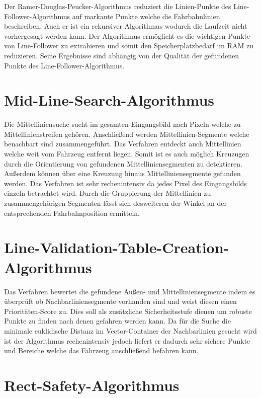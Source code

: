 Der Ramer-Douglas-Peucker-Algorithmus reduziert die Linien-Punkte des Line-Follower-Algorithmus auf markante Punkte welche die Fahrbahnlinien beschreiben. Auch er ist ein rekursiver Algorithmus wodurch die Laufzeit nicht vorhergesagt werden kann. Der Algorithmus erm\"oglicht es die wichtigen Punkte von Line-Follower zu extrahieren und somit den Speicherplatzbedarf im RAM zu reduzieren. Seine Ergebnisse sind abh\"angig von der Qualit\"at der gefundenen Punkte des Line-Follower-Algorithmus. 

\section{Mid-Line-Search-Algorithmus}
\label{section:Mid-Line-Search-Algorithmus}
Die Mittelliniensuche sucht im gesamten Eingangsbild nach Pixeln welche zu Mittellinienstreifen geh\"oren. Anschlie{\ss}end werden Mittellinien-Segmente welche benachbart sind zusammengef\"uhrt. Das Verfahren entdeckt auch Mittellinien welche weit vom Fahrzeug entfernt liegen. Somit ist es auch m\"oglich Kreuzugen durch die Orientierung von gefundenen Mittelliniensegmenten zu detektieren. Au{\ss}erdem k\"onnen \"uber eine Kreuzung hinaus Mittelliniensegmente gefunden werden. Das Verfahren ist sehr rechenintensiv da jedes Pixel des Eingangsbilds einzeln betrachtet wird. Durch die Gruppierung der Mittellinien zu zusammengeh\"origen Segmenten l\"asst sich desweiteren der Winkel an der entsprechenden Fahrbahnposition ermitteln.

\section{Line-Validation-Table-Creation-Algorithmus}
\label{section:Line-Validation-Table-Creation-Algorithmus}

Das Verfahren bewertet die gefundene Au{\ss}en- und Mittelliniensegmente indem es \"uberpr\"uft ob Nachbarliniensegmente vorhanden sind und weist diesen einen Prioritäten-Score zu. Dies soll als zus\"atzliche Sicherheitsstufe dienen um robuste Punkte zu finden nach denen gefahren werden kann. Da für die Suche die minimale euklidische Distanz im Vector-Container der Nachbarlinien gesucht wird ist der Algorithmus rechenintensiv jedoch liefert er dadurch sehr sichere Punkte und Bereiche welche das Fahrzeug anschlie{\ss}end befahren kann.  

\section{Rect-Safety-Algorithmus}
\label{section:Rect-Safety-Algorithmus}


